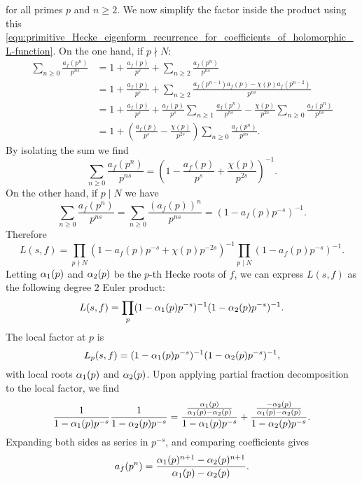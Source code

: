       for all primes $p$ and $n \ge 2$. We now simplify the factor inside the product using this \cref{equ:primitive_Hecke_eigenform_recurrence_for_coefficients_of_holomorphic_L-function}. On the one hand, if $p \nmid N$:
      \begin{align*}
        \sum_{n \ge 0}\frac{a_{f}(p^{n})}{p^{ns}} &= 1+\frac{a_{f}(p)}{p^{s}}+\sum_{n \ge 2}\frac{a_{f}(p^{n})}{p^{ns}} \\
        &= 1+\frac{a_{f}(p)}{p^{s}}+\sum_{n \ge 2}\frac{a_{f}(p^{n-1})a_{f}(p)-\chi(p)a_{f}(p^{n-2})}{p^{ns}} \\
        &= 1+\frac{a_{f}(p)}{p^{s}}+\frac{a_{f}(p)}{p^{s}}\sum_{n \ge 1}\frac{a_{f}(p^{n})}{p^{ns}}-\frac{\chi(p)}{p^{2s}}\sum_{n \ge 0}\frac{a_{f}(p^{n})}{p^{ns}} \\
        &= 1+\left(\frac{a_{f}(p)}{p^{s}}-\frac{\chi(p)}{p^{2s}}\right)\sum_{n \ge 0}\frac{a_{f}(p^{n})}{p^{ns}}.
      \end{align*}
      By isolating the sum we find
      \[
        \sum_{n \ge 0}\frac{a_{f}(p^{n})}{p^{ns}} = \left(1-\frac{a_{f}(p)}{p^{s}}+\frac{\chi(p)}{p^{2s}}\right)^{-1}.
      \]
      On the other hand, if $p \mid N$ we have
      \[
        \sum_{n \ge 0}\frac{a_{f}(p^{n})}{p^{ns}} = \sum_{n \ge 0}\frac{(a_{f}(p))^{n}}{p^{ns}} = \left(1-a_{f}(p)p^{-s}\right)^{-1}.
      \]
      Therefore
      \[
        L(s,f) = \prod_{p \nmid N}(1-a_{f}(p)p^{-s}+\chi(p)p^{-2s})^{-1}\prod_{p \mid N}(1-a_{f}(p)p^{-s})^{-1}.
      \]
      Letting $\alpha_{1}(p)$ and $\alpha_{2}(p)$ be the $p$-th Hecke roots of $f$, we can express $L(s,f)$ as the following degree $2$ Euler product:
      \[
        L(s,f) = \prod_{p}(1-\alpha_{1}(p)p^{-s})^{-1}(1-\alpha_{2}(p)p^{-s})^{-1}.
      \]
      The local factor at $p$ is 
      \[
        L_{p}(s,f) = (1-\alpha_{1}(p)p^{-s})^{-1}(1-\alpha_{2}(p)p^{-s})^{-1},
      \]
      with local roots $\alpha_{1}(p)$ and $\alpha_{2}(p)$. Upon applying partial fraction decomposition to the local factor, we find
      \[
        \frac{1}{1-\alpha_{1}(p)p^{-s}}\frac{1}{1-\alpha_{2}(p)p^{-s}} = \frac{\frac{\alpha_{1}(p)}{\alpha_{1}(p)-\alpha_{2}(p)}}{1-\alpha_{1}(p)p^{-s}}+\frac{\frac{-\alpha_{2}(p)}{\alpha_{1}(p)-\alpha_{2}(p)}}{1-\alpha_{2}(p)p^{-s}}.
      \]
      Expanding both sides as series in $p^{-s}$, and comparing coefficients gives
      \begin{equation}\label{equ:Hecke_L_function_coefficient_formula}
        a_{f}(p^{n}) = \frac{\alpha_{1}(p)^{n+1}-\alpha_{2}(p)^{n+1}}{\alpha_{1}(p)-\alpha_{2}(p)}.
      \end{equation}
